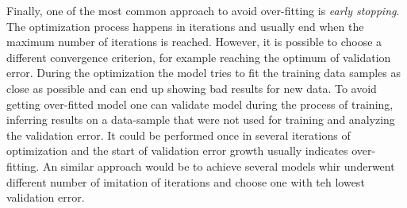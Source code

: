 Finally, one of the most common approach to avoid over-fitting is \textit{early stopping}.
The optimization process happens in iterations and usually end when the maximum number of iterations is reached.
However, it is possible to choose a different convergence criterion, for example reaching the optimum of validation error.
During the optimization the model tries to fit the training data samples as close as possible and can end up showing bad results for new data.
To avoid getting over-fitted model one can  validate model during the process of training, inferring results on a data-sample that were not used for training and analyzing the validation error.
It could be performed once in several iterations of optimization and the start of validation error growth usually indicates over-fitting.
An similar approach would be to achieve several models  whir underwent different number of imitation of iterations and choose one with teh lowest validation error.



